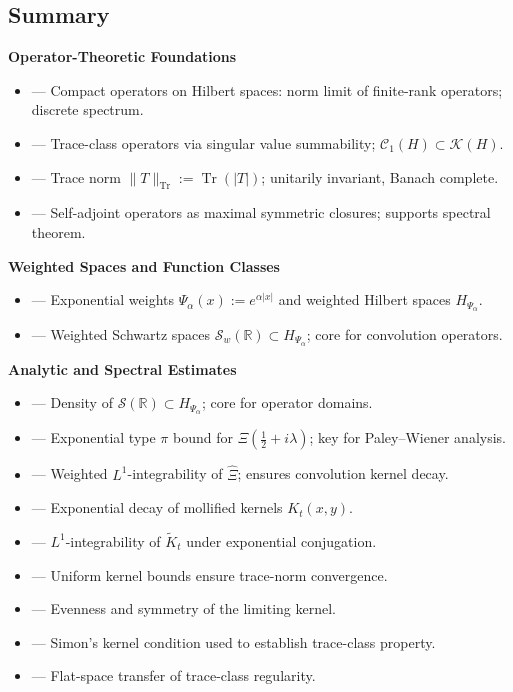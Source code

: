 \subsection*{Summary}
\label{sec:foundations_summary}

\textbf{Operator-Theoretic Foundations}
\begin{itemize}
  \item {} — Compact operators on Hilbert spaces: norm limit of finite-rank operators; discrete spectrum.
  \item {} — Trace-class operators via singular value summability; \( \mathcal{C}_1(H) \subset \mathcal{K}(H) \).
  \item {} — Trace norm \( \|T\|_{\operatorname{Tr}} := \operatorname{Tr}(|T|) \); unitarily invariant, Banach complete.
  \item {} — Self-adjoint operators as maximal symmetric closures; supports spectral theorem.
\end{itemize}

\textbf{Weighted Spaces and Function Classes}
\begin{itemize}
  \item {} — Exponential weights \( \Psi_\alpha(x) := e^{\alpha |x|} \) and weighted Hilbert spaces \( H_{\Psi_\alpha} \).
  \item {} — Weighted Schwartz spaces \( \mathcal{S}_w(\mathbb{R}) \subset H_{\Psi_\alpha} \); core for convolution operators.
\end{itemize}

\textbf{Analytic and Spectral Estimates}
\begin{itemize}
  \item {} — Density of \( \mathcal{S}(\mathbb{R}) \subset H_{\Psi_\alpha} \); core for operator domains.
  \item {} — Exponential type \( \pi \) bound for \( \Xi(\tfrac{1}{2} + i\lambda) \); key for Paley–Wiener analysis.
  \item {} — Weighted \( L^1 \)-integrability of \( \widehat{\Xi} \); ensures convolution kernel decay.
  \item {} — Exponential decay of mollified kernels \( K_t(x,y) \).
  \item {} — \( L^1 \)-integrability of \( \widetilde{K}_t \) under exponential conjugation.
  \item {} — Uniform kernel bounds ensure trace-norm convergence.
  \item {} — Evenness and symmetry of the limiting kernel.
  \item {} — Simon’s kernel condition used to establish trace-class property.
  \item {} — Flat-space transfer of trace-class regularity.
\end{itemize}

